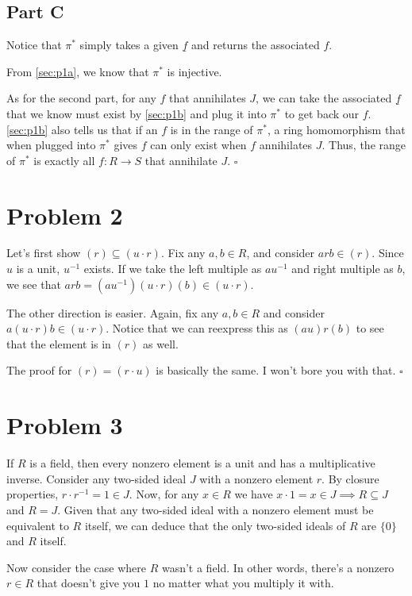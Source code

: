 \documentclass[12pt]{article}
\begin{document}
\subsection{Part C}

Notice that $\pi^*$ simply takes a given $\underline{f}$ and returns the associated $f$.

From \ref{sec:p1a}, we know that $\pi^*$ is injective.

As for the second part, for any $f$ that annihilates $J$,
we can take the associated $\underline{f}$ that we know must exist by \ref{sec:p1b}
and plug it into $\pi^*$ to get back our $f$.
\ref{sec:p1b} also tells us that if an $f$ is in the range of $\pi^*$, a ring homomorphism that
when plugged into $\pi^*$ gives $f$ can only exist when $f$ annihilates $J$.
Thus, the range of $\pi^*$ is exactly all $f: R \to S$ that annihilate $J$. $\square$

\section{Problem 2}

Let's first show $(r) \subseteq (u \cdot r)$.
Fix any $a, b \in R$, and consider $arb \in (r)$.
Since $u$ is a unit, $u^{-1}$ exists.
If we take the left multiple as $au^{-1}$ and right multiple as $b$,
we see that $arb=\left(au^{-1}\right)(u \cdot r)(b) \in (u \cdot r)$.

The other direction is easier.
Again, fix any $a, b \in R$ and consider $a(u \cdot r)b \in (u \cdot r)$.
Notice that we can reexpress this as $(au)r(b)$ to see that the element is in $(r)$ as well.

The proof for $(r)=(r \cdot u)$ is basically the same.
I won't bore you with that. $\square$

\section{Problem 3}\label{sec:p3}

If $R$ is a field, then every nonzero element is a unit and has a multiplicative inverse.
Consider any two-sided ideal $J$ with a nonzero element $r$.
By closure properties, $r \cdot r^{-1} = 1 \in J$.
Now, for any $x \in R$ we have $x \cdot 1 = x \in J \implies R \subseteq J$ and $R=J$.
Given that any two-sided ideal with a nonzero element must be equivalent to $R$
itself, we can deduce that the only two-sided ideals of $R$ are $\{0\}$ and $R$ itself.

Now consider the case where $R$ wasn't a field.
In other words, there's a nonzero $r \in R$ that doesn't give you $1$
no matter what you multiply it with.
\end{document}
